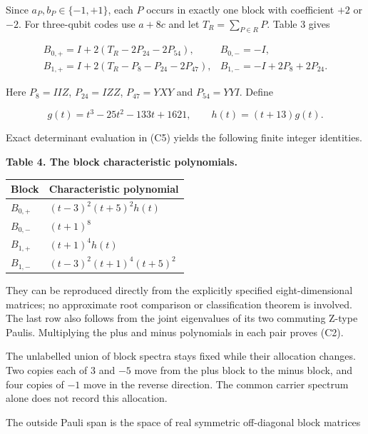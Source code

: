 \documentclass[11pt,a4paper]{article}
\begin{document}
Since \(a_P,b_P\in\{-1,+1\}\), each \(P\) occurs in exactly one block with coefficient \(+2\) or \(-2\).
For three-qubit codes use \(a+8c\) and let \(T_R=\sum_{P\in R}P\). Table 3 gives

\[\begin{array}{ll}
B_{0,+}=I+2(T_R-2P_{24}-2P_{54}),& B_{0,-}=-I,\\ B_{1,+}=I+2(T_R-P_8-P_{24}-2P_{47}),& B_{1,-}=-I+2P_8+2P_{24}.
\end{array}
\tag{C5}\]

Here \(P_8=IIZ\), \(P_{24}=IZZ\), \(P_{47}=YXY\) and \(P_{54}=YYI\). Define

\[g(t)=t^3-25t^2-133t+1621,\qquad h(t)=(t+13)g(t).\]

Exact determinant evaluation in (C5) yields the following finite integer identities.

\textbf{Table 4. The block characteristic polynomials.}

{\def\LTcaptype{none} %
{\small
\begin{longtable}[]{@{}>{\raggedright\arraybackslash}p{}>{\raggedright\arraybackslash}p{}@{}}
\toprule\noalign{}
Block & Characteristic polynomial \\
\midrule\noalign{}
\endhead
\bottomrule\noalign{}
\endlastfoot
\(B_{0,+}\) & \((t-3)^2(t+5)^2h(t)\) \\
\(B_{0,-}\) & \((t+1)^8\) \\
\(B_{1,+}\) & \((t+1)^4h(t)\) \\
\(B_{1,-}\) & \((t-3)^2(t+1)^4(t+5)^2\) \\
\end{longtable}
}
}

They can be reproduced directly from the explicitly specified eight-dimensional matrices; no
approximate root comparison or classification theorem is involved. The last row also follows from
the joint eigenvalues of its two commuting Z-type Paulis. Multiplying the plus and minus polynomials
in each pair proves (C2).

The unlabelled union of block spectra stays fixed while their allocation changes. Two copies each of
\(3\) and \(-5\) move from the plus block to the minus block, and four copies of \(-1\) move in the reverse
direction. The common carrier spectrum alone does not record this allocation.

The outside Pauli span is the space of real symmetric off-diagonal block matrices
\end{document}
